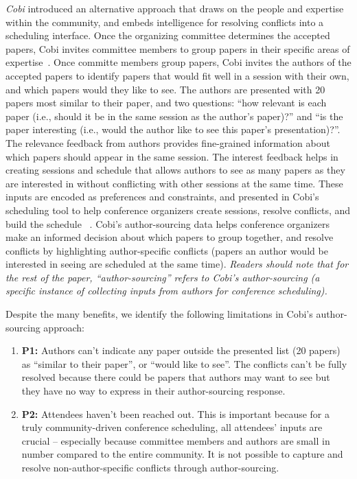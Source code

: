 \documentclass[letterpaper]{article}
\begin{document}
\emph {Cobi} introduced an alternative approach that draws on the people and expertise within the community, and embeds intelligence for resolving conflicts into a scheduling interface. Once the organizing committee determines the accepted papers, Cobi invites committee members to group papers in their specific areas of expertise~\cite{FrenzyCHI2014}. Once committe members group papers, Cobi invites the authors of the accepted papers to identify papers that would fit well in a session with their own, and which papers would they like to see.  The authors are presented with 20 papers most similar to their paper, and two questions: ``how relevant is each paper (i.e., should it be in the same session as the author's paper)?'' and ``is the paper interesting (i.e., would the author like to see this paper's presentation)?''. The relevance feedback from authors provides fine-grained information about which papers should appear in the same session. The interest feedback helps in creating sessions and schedule that allows authors to see as many papers as they are interested in without conflicting with other sessions at the same time. These inputs are encoded as preferences and constraints, and presented in Cobi's scheduling tool to help conference organizers create sessions, resolve conflicts, and build the schedule ~\cite{CobiUIST2013}. Cobi's author-sourcing data helps conference organizers make an informed decision about which papers to group together, and resolve conflicts by highlighting author-specific conflicts (papers an author would be interested in seeing are scheduled at the same time). \emph{Readers should note that for the rest of the paper, \emph{``author-sourcing''} refers to Cobi's author-sourcing (a specific instance of collecting inputs from authors for conference scheduling).}

Despite the many benefits, we identify the following limitations in Cobi's author-sourcing approach:
\begin{enumerate}
\item \textbf{P1:} Authors can't indicate any paper outside the presented list (20 papers) as ``similar to their paper'', or ``would like to see''. The conflicts can't be fully resolved because there could be papers that authors may want to see but they have no way to express in their author-sourcing response.
\item \textbf{P2:} Attendees haven't been reached out. This is important because for a truly community-driven conference scheduling, all attendees' inputs are crucial -- especially because committee members and authors are small in number compared to the entire community. It is not possible to capture and resolve non-author-specific conflicts through author-sourcing.
\end{enumerate}
\end{document}
